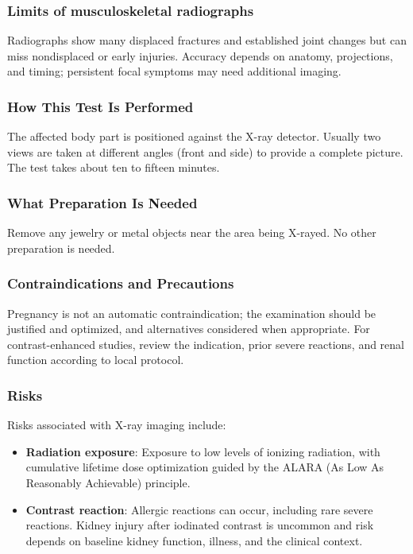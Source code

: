 \subsubsection*{Limits of musculoskeletal radiographs}
Radiographs show many displaced fractures and established joint changes but can miss nondisplaced or early injuries. Accuracy depends on anatomy, projections, and timing; persistent focal symptoms may need additional imaging.

\subsubsection*{How This Test Is Performed}
The affected body part is positioned against the X-ray detector. Usually two views are taken at different angles (front and side) to provide a complete picture. The test takes about ten to fifteen minutes.

\subsubsection*{What Preparation Is Needed}
Remove any jewelry or metal objects near the area being X-rayed. No other preparation is needed.

\subsubsection*{Contraindications and Precautions}
Pregnancy is not an automatic contraindication; the examination should be justified and optimized, and alternatives considered when appropriate. For contrast-enhanced studies, review the indication, prior severe reactions, and renal function according to local protocol.

\subsubsection*{Risks}
Risks associated with X-ray imaging include:
\begin{itemize}
    \item \textbf{Radiation exposure}: Exposure to low levels of ionizing radiation, with cumulative lifetime dose optimization guided by the ALARA (As Low As Reasonably Achievable) principle.
    \item \textbf{Contrast reaction}: Allergic reactions can occur, including rare severe reactions. Kidney injury after iodinated contrast is uncommon and risk depends on baseline kidney function, illness, and the clinical context.
\end{itemize}


